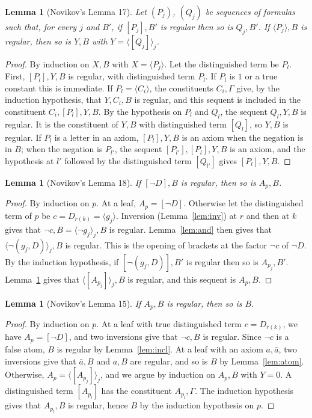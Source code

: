 \documentclass[11pt]{amsart}
\newtheorem{lemma}[theorem]{Lemma}
\theoremstyle{definition}
\theoremstyle{remark}
\newcommand{\seq}[1]{\langle #1\rangle}
\newcommand{\one}[1]{[#1]}
\begin{document}
\begin{lemma}[Novikov's Lemma 17]\label{lem:17}
  Let $(P_j)$, $(Q_j)$ be sequences of formulas such that, for every $j$
  and $B'$, if $\one{P_j},B'$ is regular then so is $Q_j,B'$. If
  $\seq{P_j},B$ is regular, then so is $Y,B$ with $Y=\seq{\one{Q_j}}_j$.
\end{lemma}

\begin{proof}
  By induction on $X,B$ with $X=\seq{P_j}$. Let the distinguished term be
  $P_l$. First, $\one{P_l},Y,B$ is regular, with distinguished term
  $P_l$. If $P_l$ is $1$ or a true constant this is immediate. If
  $P_l=\seq{C_i}$, the constituents $C_i,\Gamma$ give, by the induction
  hypothesis, that $Y,C_i,B$ is regular, and this sequent is included in
  the constituent $C_i,\one{P_l},Y,B$. By the hypothesis on $P_l$ and
  $Q_l$, the sequent $Q_l,Y,B$ is regular. It is the constituent of $Y,B$
  with distinguished term $\one{Q_l}$, so $Y,B$ is regular. If $P_l$ is a
  letter in an axiom, $\one{P_l},Y,B$ is an axiom when the negation is in
  $B$; when the negation is $P_{l'}$, the sequent
  $\one{P_{l'}},\one{P_l},Y,B$ is an axiom, and the hypothesis at $l'$
  followed by the distinguished term $\one{Q_{l'}}$ gives
  $\one{P_l},Y,B$.
\end{proof}

\begin{lemma}[Novikov's Lemma 18]\label{lem:18}
  If $\one{\neg D},B$ is regular, then so is $A_p,B$.
\end{lemma}

\begin{proof}
  By induction on $p$. At a leaf, $A_p=\one{\neg D}$. Otherwise let the
  distinguished term of $p$ be $c=D_{r(k)}=\seq{g_j}$. Inversion
  (Lemma~\ref{lem:inv}) at $r$ and then at $k$ gives that
  $\neg c,B=\seq{\neg g_j}_j,B$ is regular. Lemma~\ref{lem:and} then
  gives that $\seq{\neg(g_j,D)}_j,B$ is regular. This is the opening of
  brackets at the factor $\neg c$ of $\neg D$. By the induction
  hypothesis, if $\one{\neg(g_j,D)},B'$ is regular then so is
  $A_{p_j},B'$. Lemma~\ref{lem:17} gives that $\seq{\one{A_{p_j}}}_j,B$ is
  regular, and this sequent is $A_p,B$.
\end{proof}

\begin{lemma}[Novikov's Lemma 15]\label{lem:15}
  If $A_p,B$ is regular, then so is $B$.
\end{lemma}

\begin{proof}
  By induction on $p$. At a leaf with true distinguished term
  $c=D_{r(k)}$, we have $A_p=\one{\neg D}$, and two inversions give that
  $\neg c,B$ is regular. Since $\neg c$ is a false atom, $B$ is regular
  by Lemma~\ref{lem:incl}. At a leaf with an axiom $a,\bar a$, two
  inversions give that $\bar a,B$ and $a,B$ are regular, and so is $B$ by
  Lemma~\ref{lem:atom}. Otherwise, $A_p=\seq{\one{A_{p_j}}}_j$, and we
  argue by induction on $A_p,B$ with $Y=0$. A distinguished term
  $\one{A_{p_l}}$ has the constituent $A_{p_l},\Gamma$. The induction
  hypothesis gives that $A_{p_l},B$ is regular, hence $B$ by the
  induction hypothesis on $p$.
\end{proof}
\end{document}
